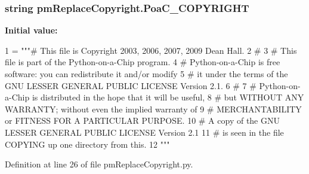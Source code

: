 \hypertarget{namespacepm_replace_copyright_a7a6335a19d4303bcd80f39866241784d}{
\subsubsection[{Poa\-C\-\_\-\-C\-O\-P\-Y\-R\-I\-G\-H\-T}]{\setlength{\rightskip}{0pt plus 5cm}string pm\-Replace\-Copyright.\-Poa\-C\-\_\-\-C\-O\-P\-Y\-R\-I\-G\-H\-T}}\label{namespacepm_replace_copyright_a7a6335a19d4303bcd80f39866241784d}
{\bfseries Initial value\-:}
\begin{DoxyCode}
1 = \textcolor{stringliteral}{"""# This file is Copyright 2003, 2006, 2007, 2009 Dean Hall.}
2 \textcolor{stringliteral}{#}
3 \textcolor{stringliteral}{# This file is part of the Python-on-a-Chip program.}
4 \textcolor{stringliteral}{# Python-on-a-Chip is free software: you can redistribute it and/or modify}
5 \textcolor{stringliteral}{# it under the terms of the GNU LESSER GENERAL PUBLIC LICENSE Version 2.1.}
6 \textcolor{stringliteral}{#}
7 \textcolor{stringliteral}{# Python-on-a-Chip is distributed in the hope that it will be useful,}
8 \textcolor{stringliteral}{# but WITHOUT ANY WARRANTY; without even the implied warranty of}
9 \textcolor{stringliteral}{# MERCHANTABILITY or FITNESS FOR A PARTICULAR PURPOSE.}
10 \textcolor{stringliteral}{# A copy of the GNU LESSER GENERAL PUBLIC LICENSE Version 2.1}
11 \textcolor{stringliteral}{# is seen in the file COPYING up one directory from this.}
12 \textcolor{stringliteral}{"""}
\end{DoxyCode}


Definition at line 26 of file pm\-Replace\-Copyright.\-py.

